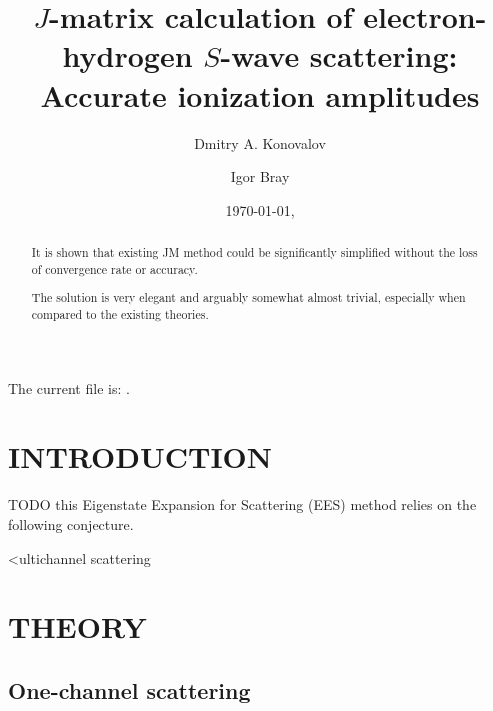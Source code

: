 \documentclass[aip
, pra
, showpacs
, aps
, twocolumn
, groupedaddress
, floatfix
]{revtex4}
\begin{document}
\title {$J$-matrix calculation of electron-hydrogen $S$-wave scattering: Accurate ionization amplitudes}

\author{Dmitry A. Konovalov}

\author{Igor Bray}


\date{\today, \currenttime}

\begin{abstract}
It is shown that existing JM method could be significantly simplified without the loss of convergence rate or accuracy.


The solution is very elegant and arguably somewhat almost trivial, especially when compared to
the existing theories.

\end{abstract}

\maketitle
The current file is: \currfilename.

\section{INTRODUCTION}
TODO
this Eigenstate Expansion for Scattering (EES) method relies on the following conjecture.

<ultichannel scattering \cite{CA73, NO72, TF79, Nesbet78, Lucchese86}

\section{THEORY}
\subsection{One-channel scattering}
\end{document}
